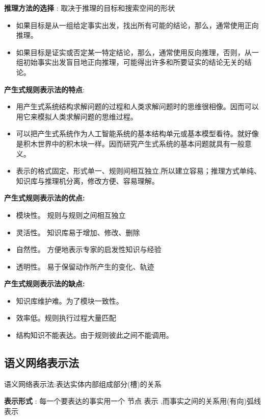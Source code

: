 \documentclass[UTF8,a4paper]{ctexart}
\begin{document}
\textbf{推理方法的选择} : 取决于推理的目标和搜索空间的形状
\begin{itemize}
	\item 如果目标是从一组给定事实出发，找出所有可能的结论，那么，通常使用正向推理。
	\item 如果目标是证实或否定某一特定结论，那么，通常使用反向推理，否则，从一组初始事实出发盲目地正向推理，可能得出许多和所要证实的结论无关的结论。
\end{itemize}

\textbf{产生式规则表示法的特点}:
\begin{itemize}
	\item 用产生式系统结构求解问题的过程和人类求解问题时的思维很相像。因而可以用它来模拟人类求解问题的思维过程。
	\item 可以把产生式系统作为人工智能系统的基本结构单元或基本模型看待。就好像是积木世界中的积木块一样。因而研究产生式系统的基本问题就具有一般意义。
	\item 表示的格式固定、形式单一、规则间相互独立,所以建立容易；推理方式单纯、知识库与推理机分离，修改方便、容易理解。
\end{itemize}

\textbf{产生式规则表示法的优点:}
\begin{itemize}
	\item 模块性。
	      规则与规则之间相互独立
	\item 灵活性。
	      知识库易于增加、修改、删除
	\item 自然性。
	      方便地表示专家的启发性知识与经验
	\item 透明性。
	      易于保留动作所产生的变化、轨迹
\end{itemize}

\textbf{产生式规则表示法的缺点:}
\begin{itemize}
	\item 知识库维护难。为了模块一致性。
	\item 效率低。规则执行过程大量匹配
	\item 结构知识不能表达。由于规则彼此之间不能调用。
\end{itemize}

\subsection{语义网络表示法}
语义网络表示法:表达实体内部组成部分(槽)的关系

\textbf{表示形式} : 每一个要表达的事实用一个 节点 表示 ,而事实之间的关系用(有向)弧线表示
\end{document}
